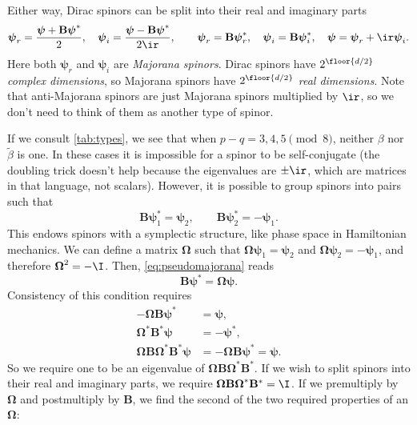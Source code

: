 \documentclass[11pt]{article}
\newcommand{\B}{\mathbf{B}}
\newcommand{\psib}{\boldsymbol{\psi}}
\newcommand{\Omegab}{\boldsymbol{\Omega}}
\newcommand{\betat}{\tilde{\beta}}
\begin{document}
Either way, Dirac spinors can be split into their real and imaginary parts
%
\begin{equation}\label{eq:majorana}
  \psib_r = \frac{\psib + \B \psib^\ast}{2},
  \quad
  \psib_i = \frac{\psib - \B \psib^\ast}{2\ir},
  \qquad
  \psib_r = \B \psib^\ast_r,
  \quad
  \psib_i = \B \psib^\ast_i,
  \quad
  \psib = \psib_r + \ir \psib_i.
\end{equation}
%
Here both $\psib_r$ and $\psib_i$ are \emph{Majorana spinors}.
Dirac spinors have $2^{\floor{d/2}}$ \emph{complex dimensions}, so Majorana spinors have $2^{\floor{d/2}}$ \emph{real dimensions}.
Note that anti-Majorana spinors are just Majorana spinors multiplied by $\ir$, so we don't need to think of them as another type of spinor.

If we consult \cref{tab:types}, we see that when \( p-q = 3,4,5 \pmod 8 \), neither $\beta$ nor $\betat$ is one.
In these cases it is impossible for a spinor to be self-conjugate
(the doubling trick doesn't help because the eigenvalues are $\pm\ir$, which are matrices in that language, not scalars).
However, it is possible to group spinors into pairs such that
%
\begin{equation}\label{eq:pseudomajorana}
  \B \psib_1^\ast = \psib_2,
  \qquad
  \B \psib_2^\ast = -\psib_1.
\end{equation}
%
This endows spinors with a symplectic structure, like phase space in Hamiltonian mechanics.
We can define a matrix $\Omegab$ such that $\Omegab \psib_1 = \psib_2$ and $\Omegab \psib_2 = -\psib_1$, and therefore $\Omegab^2 = - \I$.
Then, \cref{eq:pseudomajorana} reads
%
\begin{equation}\label{eq:symplecticmajorana}
  \B \psib^\ast = \Omegab \psib.
\end{equation}
%
Consistency of this condition requires
%
\begin{equation*}
\begin{aligned}
  - \Omegab \B \psib^\ast &= \psib, \\
  \Omegab^\ast \B^\ast \psib &= -\psib^\ast, \\
  \Omegab \B \Omegab^\ast \B^\ast \psib &= - \Omegab \B \psib^\ast = \psib.
\end{aligned}
\end{equation*}
%
So we require one to be an eigenvalue of $\Omegab \B \Omegab^\ast \B^\ast$.
If we wish to split spinors into their real and imaginary parts, we require \( \Omegab \B \Omegab^\ast \B^\ast = \I \).
If we premultiply by $\Omegab$ and postmultiply by $\B$, we find the second of the two required properties of an $\Omegab$:
\end{document}
